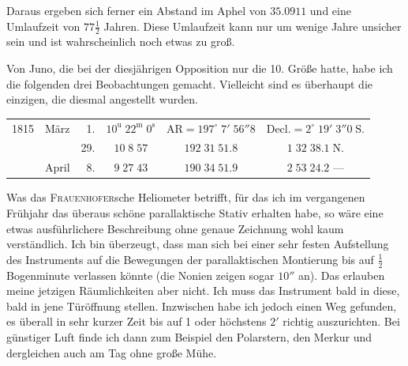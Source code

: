 \par\indent Daraus ergeben sich ferner ein Abstand im Aphel von $35.0911$ und eine Umlaufzeit von $77\tfrac12$ Jahren. Diese Umlaufzeit kann nur um wenige Jahre unsicher sein und ist wahrscheinlich noch etwas zu groß.

\par\indent Von Juno, die bei der diesjährigen Opposition nur die 10. Größe hatte, habe ich die folgenden drei Beobachtungen gemacht. Vielleicht sind es überhaupt die einzigen, die diesmal angestellt wurden.

\begin{center}\fontsize{9}{11}\selectfont\setlength{\tabcolsep}{2pt}\renewcommand{\arraystretch}{1.15}\begin{tabular}{llrccc}
1815 & März & 1. & $10^{\mathrm u}\;22^{\mathrm m}\;0^{\mathrm s}$ & $\mathrm{AR}=197^\circ\;7'\;56''8$ & $\mathrm{Decl.}=2^\circ\;19'\;3''0\;\mathrm{S.}$\\
 & & 29. & $10\;8\;57$ & $192\;31\;51.8$ & $1\;32\;38.1\;\mathrm{N.}$\\
 & April & 8. & $9\;27\;43$ & $190\;34\;51.9$ & $2\;53\;24.2$ ---\\
\end{tabular}\end{center}

\par\indent Was das \textsc{Frauenhofer}sche Heliometer betrifft, für das ich im vergangenen Frühjahr das überaus schöne parallaktische Stativ erhalten habe, so wäre eine etwas ausführlichere Beschreibung ohne genaue Zeichnung wohl kaum verständlich. Ich bin überzeugt, dass man sich bei einer sehr festen Aufstellung des Instruments auf die Bewegungen der parallaktischen Montierung bis auf $\tfrac12$ Bogenminute verlassen könnte (die Nonien zeigen sogar $10''$ an). Das erlauben meine jetzigen Räumlichkeiten aber nicht. Ich muss das Instrument bald in diese, bald in jene Türöffnung stellen. Inzwischen habe ich jedoch einen Weg gefunden, es überall in sehr kurzer Zeit bis auf 1 oder höchstens $2'$ richtig auszurichten. Bei günstiger Luft finde ich dann zum Beispiel den Polarstern, den Merkur und dergleichen auch am Tag ohne große Mühe.
